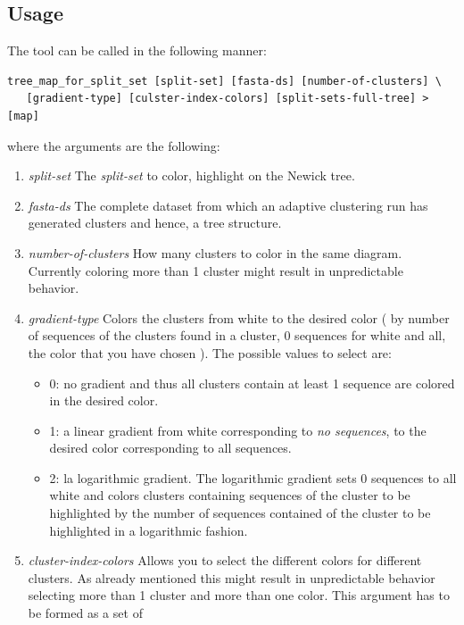 \subsection{Usage}
The tool can be called in the following manner:
\begin{lstlisting}
tree_map_for_split_set [split-set] [fasta-ds] [number-of-clusters] \
   [gradient-type] [culster-index-colors] [split-sets-full-tree] > [map]
\end{lstlisting}
where the arguments are the following:
\begin{enumerate}
  \item \emph{split-set} The \emph{split-set} to color, highlight on the
    Newick tree.
  \item \emph{fasta-ds} The complete dataset from which an adaptive
    clustering run has generated clusters and hence, a tree structure.
  \item \emph{number-of-clusters} How many clusters to color in the
    same diagram. Currently coloring more than 1 cluster might result in
    unpredictable behavior.
  \item \emph{gradient-type}
    Colors the clusters from white to the desired color ( by number of
    sequences of the clusters found in a cluster, 0 sequences for white and all,
    the color that you have chosen ). The possible values to select
    are:
    \begin{itemize}
      \item 0: no gradient and thus all clusters contain at least 1
        sequence are colored in the desired color.
      \item 1: a linear gradient from white corresponding to \emph{no
        sequences},
        to the desired color corresponding to all sequences.
      \item 2: la logarithmic gradient. The logarithmic gradient
        sets 0 sequences to all white and colors clusters containing sequences
        of the cluster to be highlighted by the number of sequences contained
        of the cluster to be highlighted in a logarithmic fashion.
    \end{itemize}
  \item \emph{cluster-index-colors} Allows you to select the different
    colors for different clusters. As already mentioned this might
    result in unpredictable behavior selecting more than 1 cluster and
    more than one color. This argument has to be formed as a set of

\end{enumerate}
